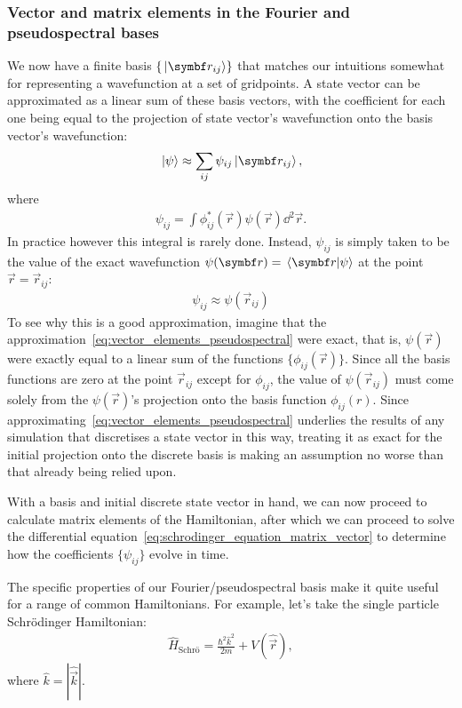 \subsubsection{Vector and matrix elements in the Fourier and pseudospectral bases}\label{sec:fourier_pseudospectral}

We now have a finite basis $\{\ket{\vec r_{ij}}\}$ that matches our intuitions somewhat for representing a wavefunction at a set of gridpoints. A state vector can be approximated as a linear sum of these basis vectors, with the coefficient for each one being equal to the projection of state vector's wavefunction onto the basis vector's wavefunction:
\begin{align}\label{eq:vector_elements_pseudospectral}
\ket{\psi} \approx \sum_{ij} \psi_{ij} \ket{\vec r_{i j}},
\end{align}
where
\begin{align}
\psi_{i j} = \int \phi_{ij}^*(\vec r) \psi(\vec r) \dd^2\vec r.
\end{align}
In practice however this integral is rarely done. Instead, $\psi_{ij}$ is simply taken to be the value of the exact wavefunction $\psi(\vec r) = \braket{\vec r}{\psi}$ at the point $\vec r = \vec r_{ij}$:
\begin{align}\label{eq:pseudospectral_vector}
\psi_{i j} \approx \psi(\vec r_{ij})
\end{align}
 To see why this is a good approximation, imagine that the approximation~\eqref{eq:vector_elements_pseudospectral} were exact, that is, $\psi(\vec r)$ were exactly equal to a linear sum of the functions $\{\phi_{ij}(\vec r)\}$. Since all the basis functions are zero at the point $\vec r_{ij}$ except for $\phi_{ij}$, the value of $\psi(\vec r_{ij})$ must come solely from the $\psi(\vec r)$'s projection onto the basis function $\phi_{ij}(r)$. Since approximating~\eqref{eq:vector_elements_pseudospectral} underlies the results of any simulation that discretises a state vector in this way, treating it as exact for the initial projection onto the discrete basis is making an assumption no worse than that already being relied upon.


With a basis and initial discrete state vector in hand, we can now proceed to calculate matrix elements of the Hamiltonian, after which we can proceed to solve the differential equation~\eqref{eq:schrodinger_equation_matrix_vector} to determine how the coefficients $\{\psi_{ij}\}$ evolve in time.

The specific properties of our Fourier/pseudospectral basis make it quite useful for a range of common Hamiltonians. For example, let's take the single particle Schr\"odinger Hamiltonian:
\begin{align}
\hat H_\textrm{Schr\"o} = \frac{\hbar^2 \hat k ^2}{2m}  + V(\hat {\vec r}),
\end{align}
where $\hat k = |\hat{\vec k}|$.

